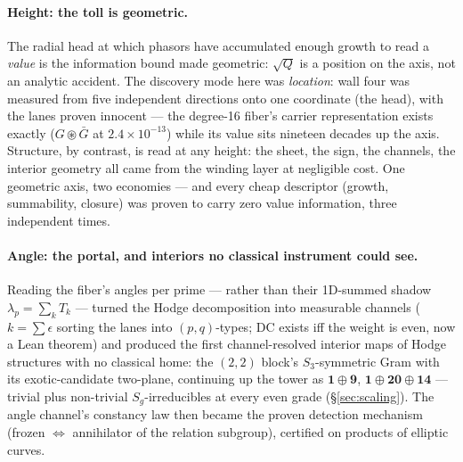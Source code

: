 \documentclass[11pt]{article}
\theoremstyle{definition}
\theoremstyle{remark}
\begin{document}
\paragraph{Height: the toll is geometric.} The radial head at which
phasors have accumulated enough growth to read a \emph{value} is the
information bound made geometric: $\sqrt Q$ is a position on the axis, not
an analytic accident. The discovery mode here was \emph{location}: wall
four was measured from five independent directions onto one coordinate
(the head), with the lanes proven innocent --- the degree-16 fiber's
carrier representation exists exactly ($G\circledast\bar G$ at
$2.4\times10^{-13}$) while its value sits nineteen decades up the axis.
Structure, by contrast, is read at any height: the sheet, the sign, the
channels, the interior geometry all came from the winding layer at
negligible cost. One geometric axis, two economies --- and every cheap
descriptor (growth, summability, closure) was proven to carry zero value
information, three independent times.

\paragraph{Angle: the portal, and interiors no classical instrument could
see.} Reading the fiber's angles per prime --- rather than their
1D-summed shadow $\lambda_p=\sum_kT_k$ --- turned the Hodge decomposition
into measurable channels ($k=\sum\epsilon$ sorting the lanes into
$(p,q)$-types; DC exists iff the weight is even, now a Lean theorem) and
produced the first channel-resolved interior maps of Hodge structures with
no classical home: the $(2,2)$ block's $S_3$-symmetric Gram with its
exotic-candidate two-plane, continuing up the tower as
$\mathbf 1\oplus\mathbf 9$, $\mathbf 1\oplus\mathbf{20}\oplus\mathbf{14}$
--- trivial plus non-trivial $S_g$-irreducibles at every even grade
(\S\ref{sec:scaling}). The angle channel's constancy law then became the
proven detection mechanism (frozen $\iff$ annihilator of the relation
subgroup), certified on products of elliptic curves.
\end{document}
